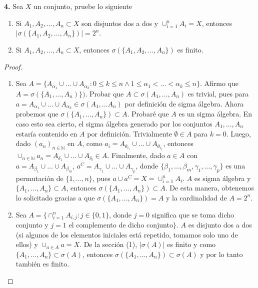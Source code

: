 \documentclass{article}
\newenvironment{statement}[1]{\smallskip\noindent\color[rgb]{1.00,0.00,0.50} {\bf #1.}}{}
\theoremstyle{definition}
\theoremstyle{remark}
\newcommand{\BN}{\mathbb N}
\begin{document}
\begin{statement}{4}
  Sea $X$ un conjunto, pruebe lo siguiente
  \begin{enumerate}
    \item Si $A_1, A_2, \dots, A_n \subset X$ son disjuntos dos a dos y $\cup_{i = 1}^n A_i = X$, entonces $|\sigma(\{A_1, A_2, \dots, A_n\})| = 2^n$.
    \item Si $A_1, A_2, \dots, A_n \subset X$, entonces $\sigma(\{A_1, A_2, \dots, A_n\})$ es finito.
  \end{enumerate}
\end{statement}

\begin{proof}
  \begin{enumerate}
    \item Sea $A = \{A_{\alpha_1} \cup \dots \cup A_{\alpha_k} : 0 \leq k \leq n \land 1 \leq \alpha_1 < \dots < \alpha_k \leq n\}$. Afirmo que $A = \sigma(\{A_1, \dots, A_n)\})$.
      Probar que $A \subset \sigma(A_1, \dots, A_n)$ es trivial, pues para $a = A_{\alpha_1} \cup \dots \cup A_{\alpha_k} \in \sigma(A_1, \dots A_n)$ por definici\'on de sigma \'algebra.
      Ahora probemos que $\sigma(\{A_1, \dots, A_n\}) \subset A$.
      Probar\'e que $A$ es un sigma \'algebra. En caso esto sea cierto, el sigma \'algebra generado por los conjuntos $A_1, \dots, A_n$ estar\'ia contenido en $A$ por definici\'on.
      Trivialmente $\emptyset \in A$ para $k = 0$.
      Luego, dado $(a_n)_{n \in \BN}$ en $A$, como $a_i = A_{\theta_{i_1}} \cup \dots \cup A_{\theta_{i_{l_i}}}$, entonces $\cup_{n \in \BN} a_n = A_{\delta_1} \cup \dots \cup A_{\delta_l} \in A$.
      Finalmente, dado $a \in A$ con $a = A_{\beta_1} \cup \dots \cup A_{\beta_m}$, $a^C = A_{\gamma_1} \cup \dots \cup A_{\gamma_p}$, donde $\{\beta_1, \dots, \beta_m, \gamma_1, \dots, \gamma_p\}$ es una permutaci\'on de $\{1, \dots, n\}$, pues $a \cup a^C = X = \cup_{i = 1}^n A_i$.
      $A$ es sigma \'algebra y $\{A_1, \dots, A_n\} \subset A$, entonces $\sigma(\{A_1, \dots, A_n\}) \subset A$.
      De esta manera, obtenemos lo solicitado gracias a que $\sigma(\{A_1, \dots, A_n\}) = A$ y la cardinalidad de $A = 2^n$.
    \item Sea $A = \{\cap_{i = 1}^{n} A_{i, j} : j \in \{0, 1\}$, donde $j = 0$ significa que se toma dicho conjunto y $j = 1$ el complemento de dicho conjunto$\}$.
      $A$ es disjunto dos a dos (si algunos de los elementos iniciales est\'a repetido, tomamos solo uno de ellos) y $\cup_{a \in A} a = X$.
      De la secci\'on (1), $|\sigma(A)|$ es finito y como $\{A_1, \dots, A_n\} \subset \sigma(A)$, entonces $\sigma(\{A_1, \dots, A_n\}) \subset \sigma(A)$ y por lo tanto tambi\'en es finito.
  \end{enumerate}
\end{proof}
\end{document}
